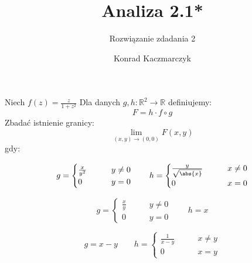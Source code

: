 \documentclass[11pt]{scrartcl}
\author{Konrad Kaczmarczyk}
\begin{document}
  \title{Analiza 2.1*}
  \subtitle{Rozwiązanie zdadania 2}
  \maketitle
    \begin{zadanie*}
        Niech $f(z) = \frac{z}{1 + z^2}$
        Dla danych $g,h : \mathbb{R}^2 \to \mathbb{R} $ definiujemy:
        \[
          F = h \cdot f \circ g
        \]
        Zbadać istnienie granicy:
        \[
            \lim_{(x,y) \to (0,0)}  F(x,y) 
        \]
        gdy:
        \begin{walk}
            \item 
              \[
                g = \begin{cases} \frac{x}{y^2} \qquad &y \not = 0 \\ 0 \qquad & y = 0 \end{cases} \qquad 
                h = \begin{cases} \frac{y}{\sqrt{\abs{x} }} \qquad &x \not = 0 \\ 0 \qquad &x = 0 \end{cases}
              \]
            \item 
              \[
                g = \begin{cases} \frac{x}{y} \qquad &y \not = 0 \\ 0 \qquad &y = 0 \end{cases} \qquad h = x
              \]
            \item 
              \[
                g = x - y \qquad h = \begin{cases} \frac{1}{x-y} \qquad &x \not = y \\ 0 \qquad &x = y \end{cases}
              \]    
        \end{walk}
    \end{zadanie*}
\end{document}
